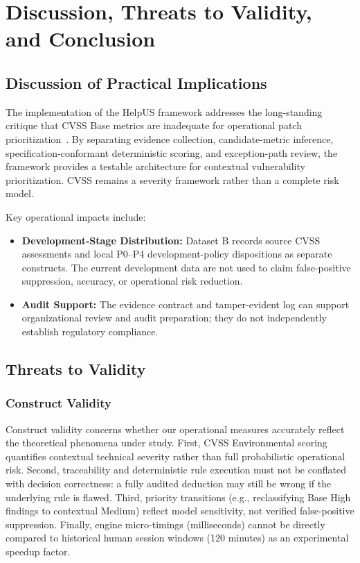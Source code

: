 \chapter{Discussion, Threats to Validity, and Conclusion}
\label{chap:conclusion}

\section{Discussion of Practical Implications}
The implementation of the HelpUS framework addresses the long-standing critique that CVSS Base metrics are inadequate for operational patch prioritization~\cite{allodi2014comparing, spring2021time}. By separating evidence collection, candidate-metric inference, specification-conformant deterministic scoring, and exception-path review, the framework provides a testable architecture for contextual vulnerability prioritization. CVSS remains a severity framework rather than a complete risk model.

Key operational impacts include:
\begin{itemize}
    \item \textbf{Development-Stage Distribution:} Dataset B records source CVSS assessments and local P0--P4 development-policy dispositions as separate constructs. The current development data are not used to claim false-positive suppression, accuracy, or operational risk reduction.
    \item \textbf{Audit Support:} The evidence contract and tamper-evident log can support organizational review and audit preparation; they do not independently establish regulatory compliance.
\end{itemize}

\section{Threats to Validity}
\subsection{Construct Validity}
Construct validity concerns whether our operational measures accurately reflect the theoretical phenomena under study. First, CVSS Environmental scoring quantifies contextual technical severity rather than full probabilistic operational risk. Second, traceability and deterministic rule execution must not be conflated with decision correctness: a fully audited deduction may still be wrong if the underlying rule is flawed. Third, priority transitions (e.g., reclassifying Base High findings to contextual Medium) reflect model sensitivity, not verified false-positive suppression. Finally, engine micro-timings (milliseconds) cannot be directly compared to historical human session windows (120 minutes) as an experimental speedup factor.

